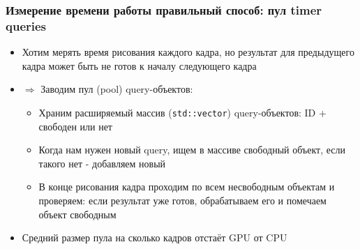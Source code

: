 \documentclass{beamer}
\begin{document}
\begin{frame}[fragile]
\frametitle{Измерение времени работы \textendash{} правильный способ: пул timer queries}
\begin{itemize}
\item Хотим мерять время рисования каждого кадра, но результат для предыдущего кадра может быть не готов к началу следующего кадра
\pause
\item \begin{math}\Rightarrow\end{math} Заводим пул (pool) query-объектов:
\pause
\begin{itemize}
\item Храним расширяемый массив (\verb|std::vector|) query-объектов: ID + свободен или нет
\pause
\item Когда нам нужен новый query, ищем в массиве свободный объект, если такого нет - добавляем новый
\pause
\item В конце рисования кадра проходим по всем несвободным объектам и проверяем: если результат уже готов, обрабатываем его и помечаем объект свободным
\end{itemize}
\pause
\item Средний размер пула \textendash{} на сколько кадров отстаёт GPU от CPU
\end{itemize}
\end{frame}
\end{document}
